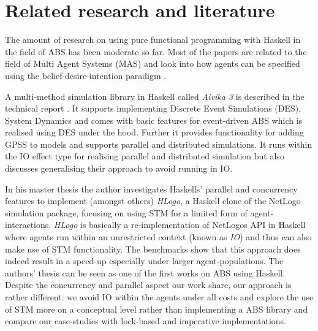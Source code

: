 \chapter{Related research and literature}
\label{ch:literature}

The amount of research on using pure functional programming with Haskell in the field of ABS has been moderate so far. Most of the papers are related to the field of Multi Agent Systems (MAS) and look into how agents can be specified using the belief-desire-intention paradigm \cite{de_jong_suitability_2014,sulzmann_specifying_2007,jankovic_functional_2007}.

A multi-method simulation library in Haskell called \textit{Aivika 3} is described in the technical report \cite{sorokin_aivika_2015}. It supports implementing Discrete Event Simulations (DES), System Dynamics and comes with basic features for event-driven ABS which is realised using DES under the hood. Further it provides functionality for adding GPSS to models and supports parallel and distributed simulations. It runs within the IO effect type for realising parallel and distributed simulation but also discusses generalising their approach to avoid running in IO.

In his master thesis \cite{bezirgiannis_improving_2013} the author investigates Haskells' parallel and concurrency features to implement (amongst others) \textit{HLogo}, a Haskell clone of the NetLogo \cite{wilensky_introduction_2015} simulation package, focusing on using STM for a limited form of agent-interactions. \textit{HLogo} is basically a re-implementation of NetLogos API in Haskell where agents run within an unrestricted context (known as \textit{IO}) and thus can also make use of STM functionality. The benchmarks show that this approach does indeed result in a speed-up especially under larger agent-populations. The authors' thesis can be seen as one of the first works on ABS using Haskell. Despite the concurrency and parallel aspect our work share, our approach is rather different: we avoid IO within the agents under all costs and explore the use of STM more on a conceptual level rather than implementing a ABS library and compare our case-studies with lock-based and imperative implementations.

